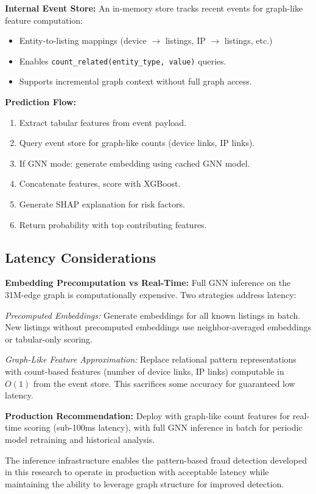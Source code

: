 \textbf{Internal Event Store:} An in-memory store tracks recent events for graph-like feature computation:
\begin{itemize}
    \item Entity-to-listing mappings (device $\rightarrow$ listings, IP $\rightarrow$ listings, etc.)
    \item Enables \texttt{count\_related(entity\_type, value)} queries.
    \item Supports incremental graph context without full graph access.
\end{itemize}

\textbf{Prediction Flow:}
\begin{enumerate}
    \item Extract tabular features from event payload.
    \item Query event store for graph-like counts (device links, IP links).
    \item If GNN mode: generate embedding using cached GNN model.
    \item Concatenate features, score with XGBoost.
    \item Generate SHAP explanation for risk factors.
    \item Return probability with top contributing features.
\end{enumerate}

\subsection{Latency Considerations}

\textbf{Embedding Precomputation vs Real-Time:} Full GNN inference on the 31M-edge graph is computationally expensive. Two strategies address latency:

\textit{Precomputed Embeddings:} Generate embeddings for all known listings in batch. New listings without precomputed embeddings use neighbor-averaged embeddings or tabular-only scoring.

\textit{Graph-Like Feature Approximation:} Replace relational pattern representations with count-based features (number of device links, IP links) computable in $O(1)$ from the event store. This sacrifices some accuracy for guaranteed low latency.

\textbf{Production Recommendation:} Deploy with graph-like count features for real-time scoring (sub-100ms latency), with full GNN inference in batch for periodic model retraining and historical analysis.

The inference infrastructure enables the pattern-based fraud detection developed in this research to operate in production with acceptable latency while maintaining the ability to leverage graph structure for improved detection.
